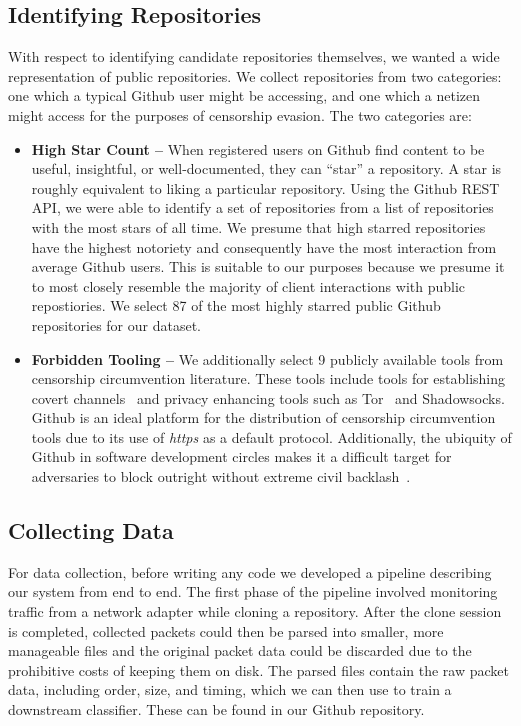 \documentclass[sigconf,authorversion,nonacm]{acmart}
\begin{document}
\subsection{Identifying Repositories}
With respect to identifying candidate repositories themselves, we wanted a wide representation of public repositories. We collect repositories from two categories: one which a typical Github user might be accessing, and one which a netizen might access for the purposes of censorship evasion. The two categories are:
\begin{itemize}
  \item \textbf{High Star Count -- } When registered users on Github find content to be useful, insightful, or well-documented, they can ``star'' a repository. A star is roughly equivalent to liking a particular repository. Using the Github REST API, we were able to identify a set of repositories from a list of repositories with the most stars of all time. We presume that high starred repositories have the highest notoriety and consequently have the most interaction from average Github users. This is suitable to our purposes because we presume it to most closely resemble the majority of client interactions with public repostiories. We select 87 of the most highly starred public Github repositories for our dataset.
  \item \textbf{Forbidden Tooling --} We additionally select 9 publicly available tools from censorship circumvention literature. These tools include tools for establishing covert channels~\citep{barradas2018effective,barradas2017deltashaper,hahn2016games,mohajeri2012skypemorph,bocovich2016slitheen} and privacy enhancing tools such as Tor~\citep{dingledine2004tor} and Shadowsocks. Github is an ideal platform for the distribution of censorship circumvention tools due to its use of \textit{https} as a default protocol. Additionally, the ubiquity of Github in software development circles makes it a difficult target for adversaries to block outright without extreme civil backlash~\citep{kan2013}.
\end{itemize}


\subsection{Collecting Data}
For data collection, before writing any code we developed a pipeline describing our system from end to end. The first phase of the pipeline involved monitoring traffic from a network adapter while cloning a repository. After the clone session is completed, collected packets could then be parsed into smaller, more manageable files and the original packet data could be discarded due to the prohibitive costs of keeping them on disk. The parsed files contain the raw packet data, including order, size, and timing, which we can then use to train a downstream classifier. These can be found in our Github repository.
\end{document}

